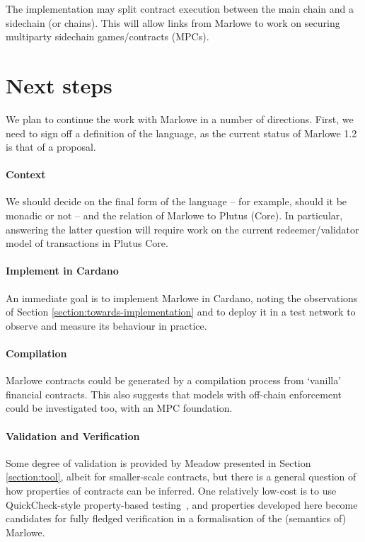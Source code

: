\documentclass[
      acmsmall
    , screen
  ]{acmart}
\begin{document}
The implementation may split contract execution between the main chain and a sidechain (or chains). This will allow links from Marlowe to work on securing multiparty sidechain games/contracts (MPCs).


\section{Next steps}
\label{section:next-steps}

We plan to continue the work with Marlowe in a number of directions. First, we need to sign off a definition of the language, as the current status of Marlowe 1.2 is that of a proposal.

\paragraph{Context}

We should decide on the final form of the language -- for example, should it be monadic or not -- and the relation of Marlowe to Plutus (Core). In particular, answering the latter question will require work on the current redeemer/validator model of transactions in Plutus Core.

\paragraph{Implement in Cardano}

An immediate goal is to implement Marlowe in Cardano, noting the observations of Section \ref{section:towards-implementation} and to deploy it in a test network to observe and measure its behaviour in practice.

\paragraph{Compilation}

Marlowe contracts could be generated by a compilation process from `vanilla' financial contracts. This also suggests that models with off-chain enforcement could be investigated too, with an MPC foundation.

\paragraph{Validation and Verification}

Some degree of validation is provided by Meadow presented in Section \ref{section:tool}, albeit for smaller-scale 
contracts, but there is a general question of how properties of contracts can be inferred. One relatively low-cost is to 
use QuickCheck-style property-based testing~\cite{quickCheck}, and properties developed here become candidates for 
fully fledged verification in a formalisation of the (semantics of) Marlowe.
\end{document}
